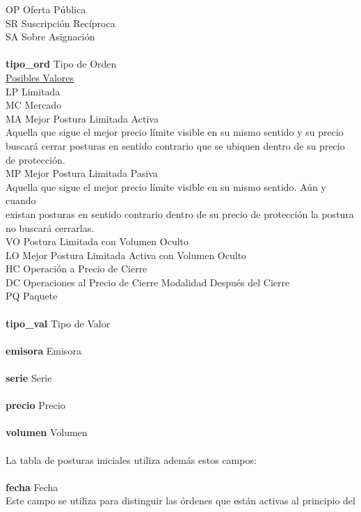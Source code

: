 \documentclass[10pt]{article}
\begin{document}
\begin{tabbing}
OP \> Oferta Pública\\
SR \> Suscripción Recíproca\\
SA \> Sobre Asignación\\
\\
\textbf{tipo\_ord} \> Tipo de Orden\\
\underline{Posibles Valores} \\
LP \> Limitada\\
MC \> Mercado\\
MA \> Mejor Postura Limitada Activa\\
Aquella que sigue el mejor precio límite visible en su mismo sentido y su precio \\
buscará cerrar posturas en sentido contrario que se ubiquen dentro de su precio\\
de protección.\\
MP \> Mejor Postura Limitada Pasiva\\
Aquella que sigue el mejor precio límite visible en su mismo sentido. Aún y cuando\\
existan posturas en sentido contrario dentro de su precio de protección la postura\\
no buscará cerrarlas.\\
VO \> Postura Limitada con Volumen Oculto\\
LO \> Mejor Postura Limitada Activa con Volumen Oculto\\
HC \> Operación a Precio de Cierre\\
DC \> Operaciones al Precio de Cierre Modalidad Después del Cierre\\
PQ \> Paquete \\
\\
\textbf{tipo\_val} \> Tipo de Valor\\
\\
\textbf{emisora} \> Emisora\\
\\
\textbf{serie} \> Serie\\
\\
\textbf{precio} \> Precio\\
\\
\textbf{volumen} \> Volumen\\
\\
La tabla de posturas iniciales utiliza además estos campos:\\
\\
\textbf{fecha} \> Fecha\\
Este campo se utiliza para distinguir las órdenes que están activas al principio del\\

\end{tabbing}
\end{document}
